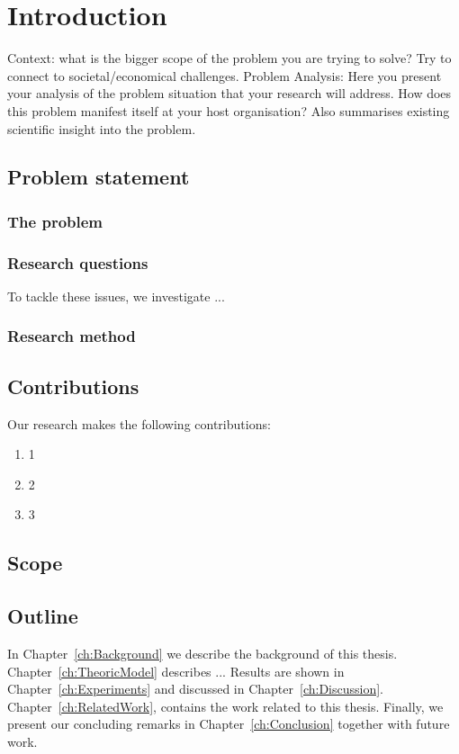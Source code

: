 \chapter{Introduction}\label{ch:Introduction}

Context: what is the bigger scope of the problem you are trying to solve? Try to connect to societal/economical challenges.
Problem Analysis: Here you present your analysis of the problem situation that your research will address.
How does this problem manifest itself at your host organisation?
Also summarises existing scientific insight into the problem.


\section{Problem statement}

\subsection{The problem}

\subsection{Research questions}
To tackle these issues, we investigate ...

\subsection{Research method}


\section{Contributions}
Our research makes the following contributions:
\begin{enumerate}
	\item 1
	\item 2
	\item 3
\end{enumerate}

\section{Scope} %

\section{Outline}
In Chapter~\ref{ch:Background} we describe the background of this thesis.
Chapter~\ref{ch:TheoricModel} describes ...
Results are shown in Chapter~\ref{ch:Experiments} and discussed in Chapter~\ref{ch:Discussion}. Chapter~\ref{ch:RelatedWork}, contains the work related to this thesis.
Finally, we present our concluding remarks in Chapter~\ref{ch:Conclusion} together with future work.
